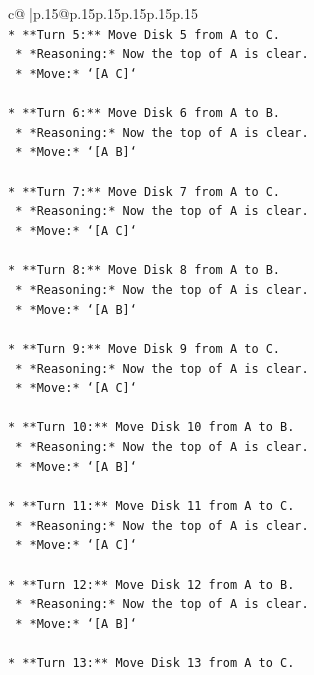 \documentclass{article}
\begin{document}
{\begin{supertabular}{c@{$\;$}|p{.15\linewidth}@{}p{.15\linewidth}p{.15\linewidth}p{.15\linewidth}p{.15\linewidth}p{.15\linewidth}}
{{{\\ 
\texttt{*   **Turn 5:** Move Disk 5 from A to C.} \\
\texttt{    *   *Reasoning:* Now the top of A is clear.} \\
\texttt{    *   *Move:* `{[}A C{]}`} \\
\\ 
\texttt{*   **Turn 6:** Move Disk 6 from A to B.} \\
\texttt{    *   *Reasoning:* Now the top of A is clear.} \\
\texttt{    *   *Move:* `{[}A B{]}`} \\
\\ 
\texttt{*   **Turn 7:** Move Disk 7 from A to C.} \\
\texttt{    *   *Reasoning:* Now the top of A is clear.} \\
\texttt{    *   *Move:* `{[}A C{]}`} \\
\\ 
\texttt{*   **Turn 8:** Move Disk 8 from A to B.} \\
\texttt{    *   *Reasoning:* Now the top of A is clear.} \\
\texttt{    *   *Move:* `{[}A B{]}`} \\
\\ 
\texttt{*   **Turn 9:** Move Disk 9 from A to C.} \\
\texttt{    *   *Reasoning:* Now the top of A is clear.} \\
\texttt{    *   *Move:* `{[}A C{]}`} \\
\\ 
\texttt{*   **Turn 10:** Move Disk 10 from A to B.} \\
\texttt{    *   *Reasoning:* Now the top of A is clear.} \\
\texttt{    *   *Move:* `{[}A B{]}`} \\
\\ 
\texttt{*   **Turn 11:** Move Disk 11 from A to C.} \\
\texttt{    *   *Reasoning:* Now the top of A is clear.} \\
\texttt{    *   *Move:* `{[}A C{]}`} \\
\\ 
\texttt{*   **Turn 12:** Move Disk 12 from A to B.} \\
\texttt{    *   *Reasoning:* Now the top of A is clear.} \\
\texttt{    *   *Move:* `{[}A B{]}`} \\
\\ 
\texttt{*   **Turn 13:** Move Disk 13 from A to C.} \\
}}}
\end{supertabular}}
\end{document}
